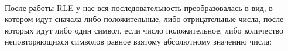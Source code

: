 {}\\

\pagebreak

После работы RLE у нас вся последовательность преобразовалась в вид, в котором идут сначала либо положительные, либо отрицательные числа, после которых идут либо один символ, если число положительное, либо количество неповторяющихся символов равное взятому абсолютному значению числа:

{}\\

